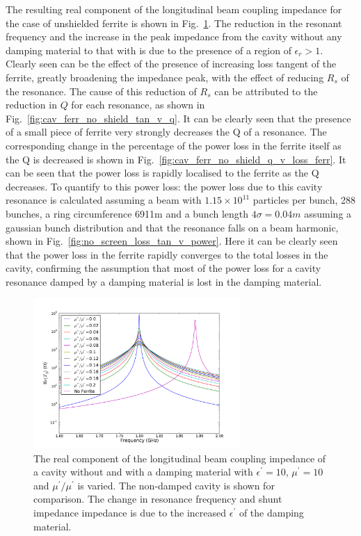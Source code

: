 The resulting real component of the longitudinal beam coupling impedance for the case of unshielded ferrite is shown in Fig.~\ref{fig:no_screen_long_imp}. The reduction in the resonant frequency and the increase in the peak impedance from the cavity without any damping material to that with is due to the presence of a region of $\epsilon_{r}>1$. Clearly seen can be the effect of the presence of increasing loss tangent of the ferrite, greatly broadening the impedance peak, with the effect of reducing $R_{s}$ of the resonance. The cause of this reduction of $R_{s}$ can be attributed to the reduction in $Q$ for each resonance, as shown in Fig.~\ref{fig:cav_ferr_no_shield_tan_v_q}. It can be clearly seen that the presence of a small piece of ferrite very strongly decreases the Q of a resonance. The corresponding change in the percentage of the power loss in the ferrite itself as the Q is decreased is shown in Fig.~\ref{fig:cav_ferr_no_shield_q_v_loss_ferr}. It can be seen that the power loss is rapidly localised to the ferrite as the Q decreases. To quantify to this power loss: the power loss due to this cavity resonance is calculated assuming a beam with $1.15 \times 10^{11}$ particles per bunch, 288 bunches, a ring circumference 6911m and a bunch length $4\sigma = 0.04m$ assuming a gaussian bunch distribution and that the resonance falls on a beam harmonic, shown in Fig.~\ref{fig:no_screen_loss_tan_v_power}. Here it can be clearly seen that the power loss in the ferrite rapidly converges to the total losses in the cavity, confirming the assumption that most of the power loss for a cavity resonance damped by a damping material is lost in the damping material. 

\begin{figure}
\begin{center}
\includegraphics[width=0.7\textwidth]{Beam_Coupling_Impedance_Reduction_Techniques/figures/no_screen_long_imp_all.pdf}
\end{center}
\caption{The real component of the longitudinal beam coupling impedance of a cavity without and with a damping material with $\epsilon^{'}=10$, $\mu^{'}=10$ and $\mu^{'}/\mu^{'}$ is varied. The non-damped cavity is shown for comparison. The change in resonance frequency and shunt impedance impedance is due to the increased $\epsilon^{'}$ of the damping material.}
\label{fig:no_screen_long_imp}
\end{figure}

